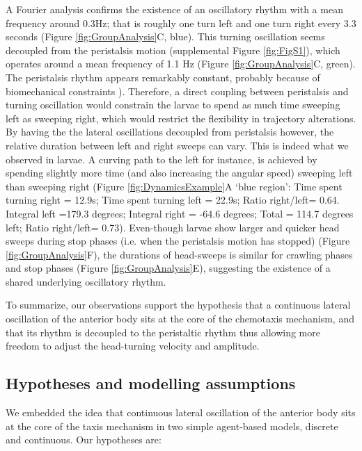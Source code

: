 \documentclass[11pt,a4paper]{article}
\begin{document}
A Fourier analysis confirms the existence of an oscillatory rhythm with a mean frequency around 0.3Hz; that is roughly one turn left and one turn right every 3.3 seconds (Figure \ref{fig:GroupAnalysis}C, blue). This turning oscillation seems decoupled from the peristalsis motion (supplemental Figure \ref{fig:FigS1}), which operates around a mean frequency of 1.1 Hz (Figure \ref{fig:GroupAnalysis}C, green). The peristalsis rhythm appears remarkably constant,  probably because of biomechanical constraints \citep{ross2015model}). Therefore, a direct coupling between peristalsis and turning oscillation would constrain the larvae to spend as much time sweeping left as sweeping right, which would restrict the flexibility in trajectory alterations. By having the the lateral oscillations decoupled from peristalsis however, the relative duration between left and right sweeps can vary. This is indeed what we observed in larvae. A curving path to the left for instance, is achieved by spending slightly more time (and also increasing the angular speed) sweeping left than sweeping right (Figure \ref{fig:DynamicsExample}A ‘blue region’:  Time spent turning right = 12.9s; Time spent turning left = 22.9s; Ratio right/left= 0.64. Integral left =179.3 degrees; Integral right = -64.6 degrees; Total = 114.7 degrees left; Ratio right/left= 0.73). Even-though larvae show larger and quicker head sweeps during stop phases (i.e. when the peristalsis motion has stopped) (Figure \ref{fig:GroupAnalysis}F), the durations of head-sweeps is similar for crawling phases and stop phases (Figure \ref{fig:GroupAnalysis}E), suggesting the existence of a shared underlying oscillatory rhythm. 

To summarize, our observations support the hypothesis that a continuous lateral oscillation of the anterior body sits at the core of the chemotaxis mechanism, and that its rhythm is decoupled to the peristaltic rhythm thus allowing more freedom to adjust the head-turning velocity and amplitude.


\subsection{Hypotheses and modelling assumptions}

We embedded the idea that continuous lateral oscillation of the anterior body sits at the core of the taxis mechanism in two simple agent-based models, discrete and continuous. Our hypotheses are:
\end{document}
